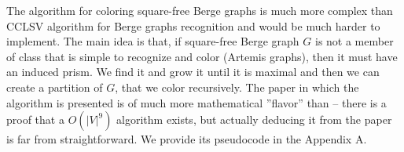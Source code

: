 The algorithm for coloring square-free Berge graphs is much more complex than CCLSV algorithm for Berge graphs recognition and would be much harder to implement. The main idea is that, if square-free Berge graph $G$ is not a member of class that is simple to recognize and color (Artemis graphs), then it must have an induced prism. We find it and grow it until it is maximal and then we can create a partition of $G$, that we color recursively. The paper in which the algorithm is presented \cite{coloringSquareFree} is of much more mathematical ''flavor'' than \cite{MC05} -- there is a proof that a $O(|V|^9)$ algorithm exists, but actually deducing it from the paper is far from straightforward. We provide its pseudocode in the Appendix A.